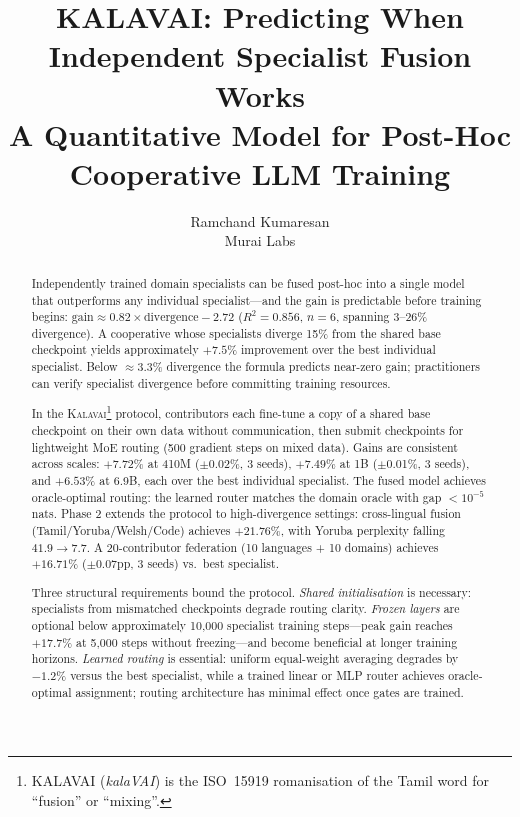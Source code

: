 \documentclass{article}
\title{KALAVAI: Predicting When Independent Specialist Fusion Works\\
       A Quantitative Model for Post-Hoc Cooperative LLM Training}
\author{%
  Ramchand Kumaresan \\
  Murai Labs
}
\newcommand{\kalavai}{\textsc{Kalavai}\xspace}
\begin{document}
\maketitle

\begin{abstract}
Independently trained domain specialists can be fused post-hoc into a single model that outperforms any individual specialist---and the gain is predictable before training begins:
$\text{gain} \approx 0.82 \times \text{divergence} - 2.72$ ($R^2 = 0.856$, $n=6$, spanning 3--26\% divergence).
A cooperative whose specialists diverge 15\% from the shared base checkpoint yields approximately $+7.5\%$ improvement over the best individual specialist.
Below $\approx$3.3\% divergence the formula predicts near-zero gain; practitioners can verify specialist divergence before committing training resources.

In the \kalavai\footnote{KALAVAI (\textit{kalaVAI}) is the ISO~15919 romanisation of the Tamil word for ``fusion'' or ``mixing''.} protocol, contributors each fine-tune a copy of a shared base checkpoint on their own data without communication, then submit checkpoints for lightweight MoE routing (500 gradient steps on mixed data).
Gains are consistent across scales: $+7.72\%$ at 410M ($\pm$0.02\%, 3 seeds), $+7.49\%$ at 1B ($\pm$0.01\%, 3 seeds), and $+6.53\%$ at 6.9B, each over the best individual specialist.
The fused model achieves oracle-optimal routing: the learned router matches the domain oracle with gap $<10^{-5}$ nats.
Phase 2 extends the protocol to high-divergence settings: cross-lingual fusion (Tamil/Yoruba/Welsh/Code) achieves $+21.76\%$, with Yoruba perplexity falling $41.9\to7.7$.
A 20-contributor federation (10 languages + 10 domains) achieves $+16.71\%$ ($\pm$0.07pp, 3 seeds) vs.\ best specialist.

Three structural requirements bound the protocol. \emph{Shared initialisation} is necessary: specialists from mismatched checkpoints degrade routing clarity. \emph{Frozen layers} are optional below approximately 10,000 specialist training steps---peak gain reaches $+17.7\%$ at 5,000 steps without freezing---and become beneficial at longer training horizons. \emph{Learned routing} is essential: uniform equal-weight averaging degrades by $-1.2\%$ versus the best specialist, while a trained linear or MLP router achieves oracle-optimal assignment; routing architecture has minimal effect once gates are trained.
\end{abstract}

\end{document}
